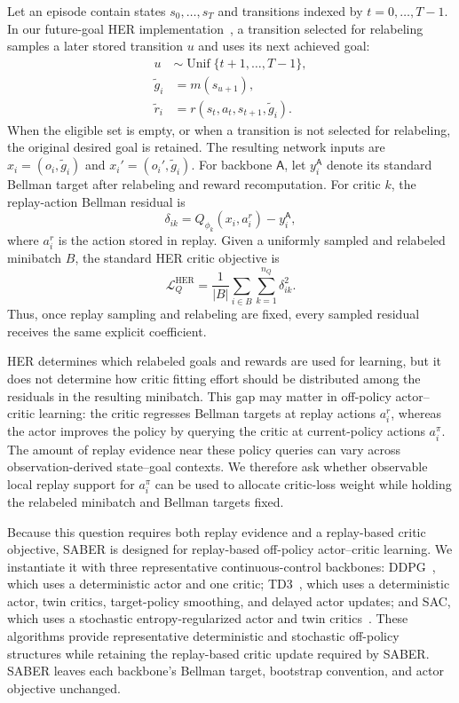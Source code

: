 \documentclass[letterpaper]{article}
\begin{document}
Let an episode contain states \(s_0,\ldots,s_T\) and transitions
indexed by \(t=0,\ldots,T-1\). In our future-goal HER
implementation~\citep{andrychowicz2017her}, a transition selected for
relabeling samples a later stored transition \(u\) and uses its next
achieved goal:
\begin{equation}
\begin{aligned}
u &\sim \operatorname{Unif}\{t+1,\ldots,T-1\},\\
\tilde g_i &= m(s_{u+1}),\\
\tilde r_i &= r(s_t,a_t,s_{t+1},\tilde g_i).
\end{aligned}
\end{equation}
When the eligible set is empty, or when a transition is not selected
for relabeling, the original desired goal is retained. The resulting network inputs are
\(x_i=(o_i,\tilde g_i)\) and \(x_i'=(o_i',\tilde g_i)\).  For backbone
\(\mathsf A\), let \(y_i^{\mathsf A}\) denote its standard Bellman
target after relabeling and reward recomputation.  For critic \(k\),
the replay-action Bellman residual is
\begin{equation}
\delta_{ik}
=Q_{\phi_k}(x_i,a_i^r)-y_i^{\mathsf A},
\end{equation}
where \(a_i^r\) is the action stored in replay.  Given a uniformly
sampled and relabeled minibatch \(B\), the standard HER critic
objective is
\begin{equation}
\mathcal L_Q^{\mathrm{HER}}
=\frac{1}{|B|}
\sum_{i\in B}\sum_{k=1}^{n_Q}\delta_{ik}^{2}.
\end{equation}
Thus, once replay sampling and relabeling are fixed, every sampled
residual receives the same explicit coefficient.

HER determines which relabeled goals and rewards are used for
learning, but it does not determine how critic fitting effort should
be distributed among the residuals in the resulting minibatch.  This
gap may matter in off-policy actor--critic learning: the critic
regresses Bellman targets at replay actions \(a_i^r\), whereas the
actor improves the policy by querying the critic at current-policy
actions \(a_i^\pi\).  The amount of replay evidence near these policy
queries can vary across observation-derived state--goal contexts.  We therefore ask
whether observable local replay support for \(a_i^\pi\) can be used
to allocate critic-loss weight while holding the relabeled minibatch
and Bellman targets fixed.

Because this question requires both replay evidence and a replay-based
critic objective, SABER is designed for replay-based off-policy
actor--critic learning.  We instantiate it with three representative
continuous-control backbones: DDPG~\citep{lillicrap2016ddpg}, which uses a deterministic actor
and one critic; TD3~\citep{fujimoto2018td3}, which uses a deterministic actor, twin critics,
target-policy smoothing, and delayed actor updates; and SAC, which
uses a stochastic entropy-regularized actor and twin
critics~\citep{haarnoja2018sac}.
These algorithms provide representative deterministic and stochastic
off-policy structures while retaining the replay-based critic update
required by SABER.  SABER leaves each backbone's Bellman target,
bootstrap convention, and actor objective unchanged.
\end{document}
